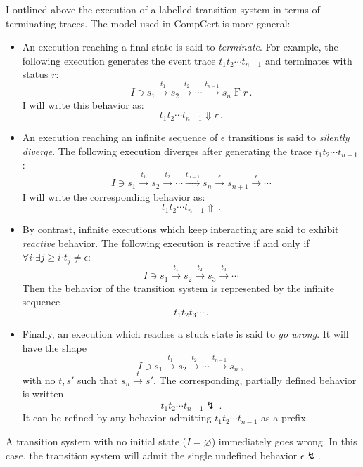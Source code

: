 \documentclass[11pt,oneside,draft]{book}
\theoremstyle{definition}
\newcommand{\bdot}{\boldsymbol{\cdot}}
\begin{document}
I outlined above the execution of a labelled transition system
in terms of terminating traces.
The model used in CompCert is more general:
\begin{itemize}
\item An execution reaching a final state is said to
    \emph{terminate}.
    For example,
    the following execution generates
    the event trace $t_1 t_2 \cdots t_{n-1}$
    and terminates with status $r$:
    \[
        I \ni s_1 \stackrel{t_1}{\rightarrow}
          s_2 \stackrel{t_2}{\rightarrow}
          \cdots \stackrel{t_{n-1}}{\rightarrow}
          s_n \mathrel{F} r \,.
    \]
    I will write this behavior as:
    \[
      t_1 t_2 \cdots t_{n-1} \Downarrow r
      \,.
    \]
\item An execution reaching
    an infinite sequence of $\epsilon$ transitions
    is said to \emph{silently diverge}.
    The following execution diverges after
    generating the trace $t_1 t_2 \cdots t_{n-1}$:
    \[
        I \ni s_1 \stackrel{t_1}{\rightarrow}
          s_2 \stackrel{t_2}{\rightarrow}
          \cdots \stackrel{t_{n-1}}{\rightarrow}
          s_n \stackrel{\epsilon}{\rightarrow}
          s_{n+1} \stackrel{\epsilon}{\rightarrow}
          \cdots
    \]
    I will write the corresponding behavior as:
    \[
      t_1 t_2 \cdots t_{n-1} \Uparrow
      \,.
    \]
\item By contrast,
    infinite executions which keep interacting
    are said to exhibit \emph{reactive} behavior.
    The following execution
    is reactive if and only if
    $\forall i \bdot \exists j \ge i \bdot t_j \ne \epsilon$:
    \[
        I \ni s_1 \stackrel{t_1}{\rightarrow}
          s_2 \stackrel{t_2}{\rightarrow}
          s_3 \stackrel{t_3}{\rightarrow}
          \cdots
    \]
    Then the behavior of the transition system
    is represented by the infinite sequence
    \[
      t_1 t_2 t_3 \cdots
      \,.
    \]
\item Finally, an execution which reaches a stuck state
    is said to \emph{go wrong}. It will have the shape
    \[
        I \ni s_1 \stackrel{t_1}{\rightarrow}
          s_2 \stackrel{t_2}{\rightarrow}
          \cdots \stackrel{t_{n-1}}{\rightarrow}
          s_n \,,
    \]
    with no $t, s'$ such that
    $s_n \stackrel{t}{\rightarrow} s'$.
    The corresponding, partially defined behavior is written
    \[
      t_1 t_2 \cdots t_{n-1} \lightning
      \,.
    \]
    It can be refined by any behavior
    admitting $t_1 t_2 \cdots t_{n-1}$ as a prefix.
\end{itemize}
A transition system with no initial state ($I = \varnothing$)
immediately goes wrong.
In this case,
the transition system will admit the single undefined behavior
$\epsilon \lightning$.
\end{document}
